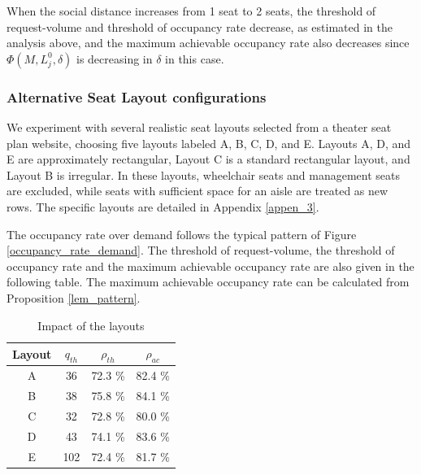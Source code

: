 
When the social distance increases from 1 seat to 2 seats, the threshold of request-volume and threshold of occupancy rate decrease, as estimated in the analysis above, and the maximum achievable occupancy rate also decreases since $\Phi(M, L_j^{0}, \delta)$ is decreasing in $\delta$ in this case.


\subsubsection{Alternative Seat Layout configurations}
We experiment with several realistic seat layouts selected from a theater seat plan website, choosing five layouts labeled A, B, C, D, and E. Layouts A, D, and E are approximately rectangular, Layout C is a standard rectangular layout, and Layout B is irregular. In these layouts, wheelchair seats and management seats are excluded, while seats with sufficient space for an aisle are treated as new rows. The specific layouts are detailed in Appendix \ref{appen_3}.

The occupancy rate over demand follows the typical pattern of Figure \ref{occupancy_rate_demand}. The threshold of request-volume, the threshold of occupancy rate and the maximum achievable occupancy rate are also given in the following table. The maximum achievable occupancy rate can be calculated from Proposition \ref{lem_pattern}.

\begin{table}[ht]
  \centering
  \caption{Impact of the layouts}
  \begin{tabular}{cccc}
  \hline
   Layout & $q_{th}$ & $\rho_{th}$ & $\rho_{ac}$ \\
  \hline
   A & 36 & 72.3 \% & 82.4 \% \\
   B & 38 & 75.8 \% & 84.1 \% \\
   C & 32 & 72.8 \% & 80.0 \% \\
   D & 43 & 74.1 \%  & 83.6 \% \\
   E & 102 & 72.4 \% & 81.7 \% \\
   \hline
  \end{tabular}
\end{table}

